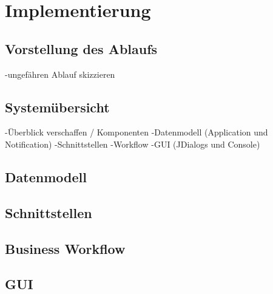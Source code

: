 \section{Implementierung}
\subsection{Vorstellung des Ablaufs}
	-ungefähren Ablauf skizzieren
\subsection{Systemübersicht}
	-Überblick verschaffen / Komponenten
		-Datenmodell (Application und Notification)
		-Schnittstellen
		-Workflow
		-GUI (JDialogs und Console)

\subsection{Datenmodell}

\subsection{Schnittstellen}

\subsection{Business Workflow}

\subsection{GUI}